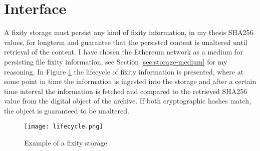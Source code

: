 \section{Interface}
A fixity storage must persist any kind of fixity information, in my thesis SHA256 values, for longterm and guarantee that the persisted content is unaltered until retrieval of the content. I have chosen the Ethereum network as a medium for persisting file fixity information, see Section \ref{sec:storage-medium} for my reasoning. In Figure \ref{fig:lifecycle} the lifecycle of fixity information is presented, where at some point in time the information is ingested into the storage and after a certain time interval the information is fetched and compared to the retrieved SHA256 value from the digital object of the archive. If both cryptographic hashes match, the object is guaranteed to be unaltered. 
\begin{figure}[b]
    \label{fig:lifecycle}
    \centering
    \caption{Example of a fixity storage}
    \texttt{[image: lifecycle.png]}
\end{figure}
